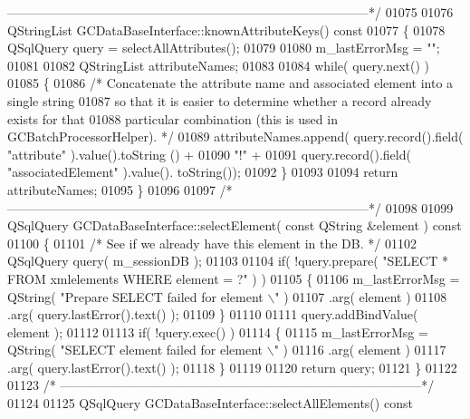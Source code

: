 \begin{DoxyCode}
{{{{{{{{{{{{{{{{{{{{{{{{{{{{{{{{{{{{{{      --------------------------------------------------------------------------------------*/}
01075 
01076 QStringList GCDataBaseInterface::knownAttributeKeys()\textcolor{keyword}{ const}
01077 \textcolor{keyword}{}\{
01078   QSqlQuery query = selectAllAttributes();
01079 
01080   m\_lastErrorMsg = \textcolor{stringliteral}{""};
01081 
01082   QStringList attributeNames;
01083 
01084   \textcolor{keywordflow}{while}( query.next() )
01085   \{
01086     \textcolor{comment}{/* Concatenate the attribute name and associated element into a single
       string}
01087 \textcolor{comment}{      so that it is easier to determine whether a record already exists for
       that}
01088 \textcolor{comment}{      particular combination (this is used in GCBatchProcessorHelper). */}
01089     attributeNames.append( query.record().field( \textcolor{stringliteral}{"attribute"} ).value().toString
      () +
01090                            \textcolor{stringliteral}{"!"} +
01091                            query.record().field( \textcolor{stringliteral}{"associatedElement"} ).value().
      toString());
01092   \}
01093 
01094   \textcolor{keywordflow}{return} attributeNames;
01095 \}
01096 
01097 \textcolor{comment}{/*
      --------------------------------------------------------------------------------------*/}
01098 
01099 QSqlQuery GCDataBaseInterface::selectElement( \textcolor{keyword}{const} QString &element )\textcolor{keyword}{ const}
01100 \textcolor{keyword}{}\{
01101   \textcolor{comment}{/* See if we already have this element in the DB. */}
01102   QSqlQuery query( m\_sessionDB );
01103 
01104   \textcolor{keywordflow}{if}( !query.prepare( \textcolor{stringliteral}{"SELECT * FROM xmlelements WHERE element = ?"} ) )
01105   \{
01106     m\_lastErrorMsg = QString( \textcolor{stringliteral}{"Prepare SELECT failed for element \(\backslash\)"%
      )
01107         .arg( element )
01108         .arg( query.lastError().text() );
01109   \}
01110 
01111   query.addBindValue( element );
01112 
01113   \textcolor{keywordflow}{if}( !query.exec() )
01114   \{
01115     m\_lastErrorMsg = QString( \textcolor{stringliteral}{"SELECT element failed for element \(\backslash\)"%
      )
01116         .arg( element )
01117         .arg( query.lastError().text() );
01118   \}
01119 
01120   \textcolor{keywordflow}{return} query;
01121 \}
01122 
01123 \textcolor{comment}{/*
      --------------------------------------------------------------------------------------*/}
01124 
01125 QSqlQuery GCDataBaseInterface::selectAllElements()\textcolor{keyword}{ const}
}}}}}}}}}}}}}}}}}}}}}}}}}}}}}}}}}}}}}}}
\end{DoxyCode}

